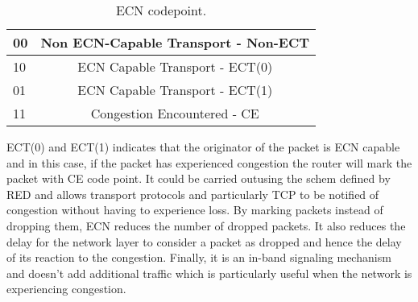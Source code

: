 \begin{table}
\begin{center}
\begin{tabular}{| l | c| } \hline 
00 & Non ECN-Capable Transport - Non-ECT \\ \hline 
10 & ECN Capable Transport - ECT(0) \\ \hline 
01 & ECN Capable Transport - ECT(1) \\ \hline 
11 & Congestion Encountered - CE  \\ \hline 
\end{tabular}
\caption{
  ECN codepoint.
    \label{fig:ECN}
}
\end{center}
\end{table}

ECT(0) and ECT(1) indicates that the originator of the packet is ECN capable and in this case, if the packet has experienced congestion the router will mark the packet with CE code point. It could be carried outusing the schem defined by RED and allows transport protocols and particularly TCP to be notified of congestion without having to experience loss. 
By marking packets instead of dropping them, ECN reduces the number of dropped packets. It also reduces the delay for the network layer to consider a packet as dropped and hence the delay of its reaction to the congestion. Finally, it is an in-band signaling mechanism and doesn't add additional traffic which is particularly useful when the network is experiencing congestion.

